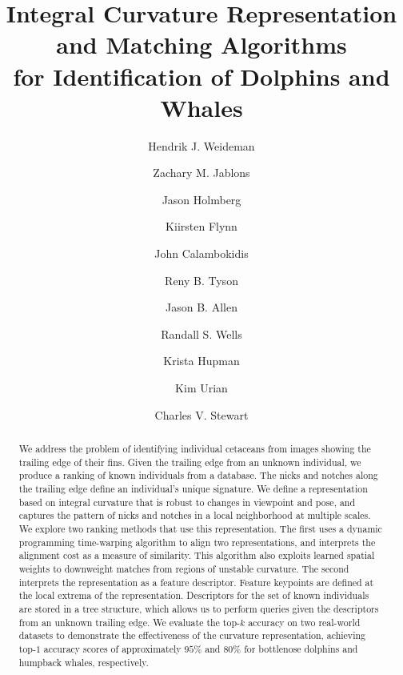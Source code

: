 \documentclass[10pt,twocolumn,letterpaper]{article}
\makeatletter
\renewcommand\AB@affilsepx{ --- \protect\Affilfont}
\makeatother
\begin{document}
\title{Integral Curvature Representation and Matching Algorithms\\ for
Identification of Dolphins and Whales}

\renewcommand\Authands{, }
\author[1]{Hendrik J. Weideman}
\author[1]{Zachary M. Jablons}
\author[2]{Jason Holmberg}
\author[3]{Kiirsten Flynn}
\author[3]{John Calambokidis}
\author[4]{Reny B. Tyson}
\author[4]{Jason B. Allen}
\author[4]{Randall S. Wells}
\author[5]{Krista Hupman}
\author[6]{Kim Urian}
\author[1]{Charles V. Stewart}
\makeatletter
\renewcommand\AB@affilsepx{\\\protect\Affilfont}
\makeatother
{}
\makeatletter
\renewcommand\AB@affilsepx{ \protect\Affilfont}
\makeatother
{}

\maketitle
\thispagestyle{empty}


\begin{abstract}
  We address the problem of identifying individual cetaceans from images
  showing the trailing edge of their fins.  Given the trailing edge from an
  unknown individual, we produce a ranking of known individuals from a
  database.  The nicks and notches along the trailing edge define an
  individual's unique signature.  We define a representation based on integral
  curvature that is robust to changes in viewpoint and pose, and captures the
  pattern of nicks and notches in a local neighborhood at multiple scales.  We
  explore two ranking methods that use this representation.  The first uses a
  dynamic programming time-warping algorithm to align two representations, and
  interprets the alignment cost as a measure of similarity.  This algorithm
  also exploits learned spatial weights to downweight matches from regions of
  unstable curvature.  The second interprets the representation as a feature
  descriptor.  Feature keypoints are defined at the local extrema of the
  representation.  Descriptors for the set of known individuals are stored in a
  tree structure, which allows us to perform queries given the descriptors from
  an unknown trailing edge.  We evaluate the top-$k$ accuracy on two real-world
  datasets to demonstrate the effectiveness of the curvature representation,
  achieving top-$1$ accuracy scores of approximately $95\%$ and $80\%$ for
  bottlenose dolphins and humpback whales, respectively.
\end{abstract}
\end{document}
